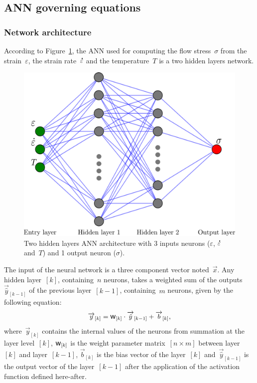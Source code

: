 \documentclass[algorithms,article,submit,pdftex,oneauthors]{Definitions/mdpi}
\DeclareRobustCommand{\w}{\mbox{\large\ensuremath{\mathsf{w}}}}
\DeclareRobustCommand{\lay}[1]{_{[#1]}}
\DeclareRobustCommand{\Lay}[1]{\mbox{$[#1]$}}
\DeclareRobustCommand{\mdot}[1]{\accentset{\mbox{\bfseries .}}{#1}}
\begin{document}
\subsection{ANN governing equations}\label{subsec:ANN-eqn}

\subsubsection{Network architecture}\label{subsubsec:ANN-arch}
According to Figure~\ref{fig:ANN-2HL}, the ANN used for computing the flow stress~$\sigma$ from the strain~$\varepsilon$, the strain rate~$\mdot{\varepsilon}$ and the temperature~$T$ is a two hidden layers network.
\begin{figure}[h!]
\centering
\includegraphics[width=0.55\columnwidth]{Figures/ANN-2HL}
\caption{Two hidden layers ANN architecture with 3 inputs neurons ($\varepsilon$, $\mdot{\varepsilon}$ and~$T$) and 1 output neuron ($\sigma$).}
\label{fig:ANN-2HL}
\end{figure}
The input of the neural network is a three component vector noted~$\overrightarrow{x}$.
Any hidden layer~\Lay{k}, containing~$n$ neurons, takes a weighted sum of the outputs~$\overrightarrow{\hat{y}}\lay{k-1}$ of the previous layer~\Lay{k-1}, containing~$m$ neurons, given by the following equation:
\begin{equation}
\overrightarrow{y}\lay{k} = \w\lay{k} \cdot \overrightarrow{\hat{y}}\lay{k-1}+ \overrightarrow{b}\lay{k}\label{eq:ANN-y},
\end{equation}
where~$\overrightarrow{y}\lay{k}$ contains the internal values of the neurons from summation at the layer level~\Lay{k}, $\w\lay{k}$ is the weight parameter matrix~$[n\times m]$ between layer~\Lay{k} and layer~\Lay{k-1}, $\overrightarrow{b}\lay{k}$ is the bias vector of the layer~\Lay{k} and~$\overrightarrow{\hat{y}}\lay{k-1}$ is the output vector of the layer~\Lay{k-1} after the application of the activation function defined here-after.
\end{document}

